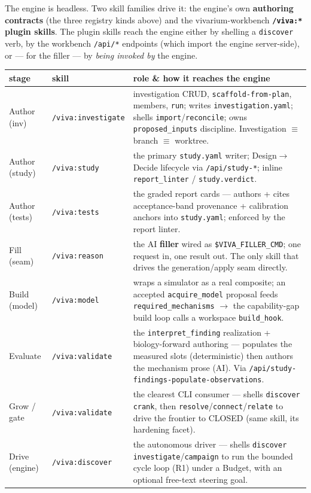 \documentclass[11pt]{article}
\newcommand{\code}[1]{\texttt{\small #1}}
\begin{document}
The engine is headless. Two skill families drive it: the engine's own \textbf{authoring contracts}
(the three registry kinds above) and the vivarium-workbench \textbf{\code{/viva:*} plugin skills}.
The plugin skills reach the engine either by shelling a \code{discover} verb, by the workbench
\code{/api/*} endpoints (which import the engine server-side), or --- for the filler --- by
\emph{being invoked by} the engine.

\begin{center}\small
\begin{tabularx}{\textwidth}{@{}l l Y@{}}
\toprule
\textbf{stage} & \textbf{skill} & \textbf{role \& how it reaches the engine}\\
\midrule
Author (inv)   & \code{/viva:investigate} & investigation CRUD, \code{scaffold-from-plan}, members, \code{run}; writes \code{investigation.yaml}; shells \code{import}/\code{reconcile}; owns \code{proposed\_inputs} discipline. Investigation $\equiv$ branch $\equiv$ worktree.\\
Author (study) & \code{/viva:study} & the primary \code{study.yaml} writer; Design$\rightarrow$Decide lifecycle via \code{/api/study-*}; inline \code{report\_linter} / \code{study.verdict}.\\
Author (tests) & \code{/viva:tests} & the graded report cards --- authors + cites acceptance-band provenance + calibration anchors into \code{study.yaml}; enforced by the report linter.\\
Fill (seam)    & \code{/viva:reason} & the AI \textbf{filler} wired as \code{\$VIVA\_FILLER\_CMD}; one request in, one result out. The only skill that drives the generation/apply seam directly.\\
Build (model)  & \code{/viva:model} & wraps a simulator as a real composite; an accepted \code{acquire\_model} proposal feeds \code{required\_mechanisms} $\rightarrow$ the capability-gap build loop calls a workspace \code{build\_hook}.\\
Evaluate       & \code{/viva:validate} & the \code{interpret\_finding} realization + biology-forward authoring --- populates the measured slots (deterministic) then authors the mechanism prose (AI). Via \code{/api/study-findings-populate-observations}.\\
Grow / gate    & \code{/viva:validate} & the clearest CLI consumer --- shells \code{discover crank}, then \code{resolve}/\code{connect}/\code{relate} to drive the frontier to CLOSED (same skill, its hardening facet).\\
Drive (engine) & \code{/viva:discover} & the autonomous driver --- shells \code{discover investigate}/\code{campaign} to run the bounded cycle loop (R1) under a Budget, with an optional free-text steering goal.\\

\end{tabularx}
\end{center}
\end{document}
